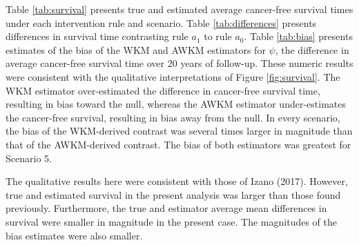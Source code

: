 \documentclass[
  11pt,
]{article}
\begin{document}
Table \ref{tab:survival} presents true and estimated average cancer-free
survival times under each intervention rule and scenario. Table
\ref{tab:differences} presents differences in survival time contrasting
rule \(a_1\) to rule \(a_0\). Table \ref{tab:bias} presents estimates of
the bias of the WKM and AWKM estimators for \(\psi\), the difference in
average cancer-free survival time over 20 years of follow-up. These
numeric results were consistent with the qualitative interpretations of
Figure \ref{fig:survival}. The WKM estimator over-estimated the
difference in cancer-free survival time, resulting in bias toward the
null, whereas the AWKM estimator under-estimates the cancer-free
survival, resulting in bias away from the null. In every scenario, the
bias of the WKM-derived contrast was several times larger in magnitude
than that of the AWKM-derived contrast. The bias of both estimators was
greatest for Scenario 5.

The qualitative results here were consistent with those of Izano (2017).
However, true and estimated survival in the present analysis was larger
than those found previously. Furthermore, the true and estimator average
mean differences in survival were smaller in magnitude in the present
case. The magnitudes of the bias estimates were also smaller.
\end{document}
